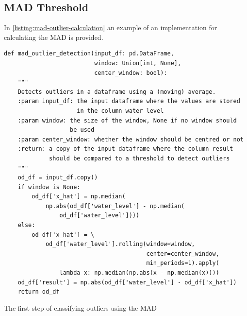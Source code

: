 \subsection{MAD Threshold}
In \autoref{listing:mad-outlier-calculation} an example of an implementation for calculating the \ac{MAD} is provided.
\begin{listing}
\begin{verbatim}
def mad_outlier_detection(input_df: pd.DataFrame,
                          window: Union[int, None],
                          center_window: bool):
    """
    Detects outliers in a dataframe using a (moving) average.
    :param input_df: the input dataframe where the values are stored
                     in the column water_level
    :param window: the size of the window, None if no window should
                   be used
    :param center_window: whether the window should be centred or not
    :return: a copy of the input dataframe where the column result
             should be compared to a threshold to detect outliers
    """
    od_df = input_df.copy()
    if window is None:
        od_df['x_hat'] = np.median(
            np.abs(od_df['water_level'] - np.median(
                od_df['water_level'])))
    else:
        od_df['x_hat'] = \
            od_df['water_level'].rolling(window=window,
                                         center=center_window,
                                         min_periods=1).apply(
                lambda x: np.median(np.abs(x - np.median(x))))
    od_df['result'] = np.abs(od_df['water_level'] - od_df['x_hat'])
    return od_df
\end{verbatim}
\caption{The first step of classifying outliers using the \ac{MAD}}
\label{listing:mad-outlier-calculation}
\end{listing}

